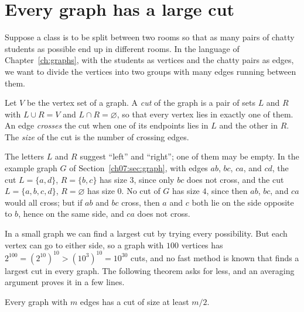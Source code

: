 \section{Every graph has a large cut}\label{ch13:sec:cut}
Suppose a class is to be split between two rooms so that as many pairs of chatty students as possible end up in different rooms. In the language of Chapter~\ref{ch:graphs}, with the students as vertices and the chatty pairs as edges, we want to divide the vertices into two groups with many edges running between them.

\par\noindent\begin{minipage}{\linewidth}
\begin{definition}[Cut]\label{ch13:def:cut}
Let $V$ be the vertex set of a graph. A \emph{cut} of the graph is a pair of sets $L$ and $R$ with $L\cup R=V$ and $L\cap R=\varnothing$, so that every vertex lies in exactly one of them. An edge \emph{crosses} the cut when one of its endpoints lies in $L$ and the other in $R$. The \emph{size} of the cut is the number of crossing edges.
\end{definition}
\end{minipage}\par

The letters $L$ and $R$ suggest ``left'' and ``right''; one of them may be empty. In the example graph $G$ of Section~\ref{ch07:sec:graph}, with edges $ab$, $bc$, $ca$, and $cd$, the cut $L=\{a,d\}$, $R=\{b,c\}$ has size $3$, since only $bc$ does not cross, and the cut $L=\{a,b,c,d\}$, $R=\varnothing$ has size $0$. No cut of $G$ has size $4$, since then $ab$, $bc$, and $ca$ would all cross; but if $ab$ and $bc$ cross, then $a$ and $c$ both lie on the side opposite to $b$, hence on the same side, and $ca$ does not cross.

In a small graph we can find a largest cut by trying every possibility. But each vertex can go to either side, so a graph with $100$ vertices has $2^{100}=(2^{10})^{10}>(10^3)^{10}=10^{30}$ cuts, and no fast method is known that finds a largest cut in every graph. The following theorem asks for less, and an averaging argument proves it in a few lines.

\par\noindent\begin{minipage}{\linewidth}
\begin{theorem}\label{thm:cut}
Every graph with $m$ edges has a cut of size at least $m/2$.
\end{theorem}
\end{minipage}\par

